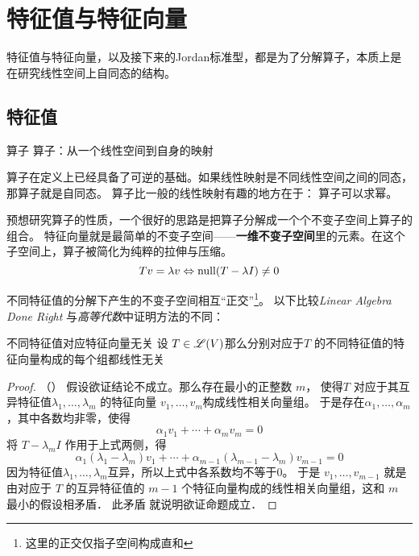 \chapter{特征值与特征向量}
特征值与特征向量，以及接下来的Jordan标准型，都是为了分解算子，本质上是在研究线性空间上自同态的结构。

\section{特征值}
\begin{definition}{算子}
    算子：从一个线性空间到自身的映射
\end{definition}

算子在定义上已经具备了可逆的基础。如果线性映射是不同线性空间之间的同态，那算子就是自同态。
算子比一般的线性映射有趣的地方在于： 算子可以求幂。

预想研究算子的性质，一个很好的思路是把算子分解成一个个不变子空间上算子的组合。
特征向量就是最简单的不变子空间——\textbf{一维不变子空间}里的元素。在这个子空间上，算子被简化为纯粹的拉伸与压缩。
\[
    Tv=\lambda v \Leftrightarrow \operatorname{null}(T-\lambda I)\neq {0}
\]

不同特征值的分解下产生的不变子空间相互``正交''\footnote{这里的正交仅指子空间构成直和}。
以下比较\textit{Linear Algebra Done Right} 与\textit{高等代数}中证明方法的不同：

\begin{theorem}{不同特征值对应特征向量无关}
    设 \(T \in \mathscr{L}(V)\)那么分别对应于\(T\) 的不同特征值的特征向量构成的每个组都线性无关
\end{theorem}

\begin{proof}
    （\cite[p.~114]{LinearAlgebraDone2024}）
    假设欲证结论不成立。那么存在最小的正整数 \(m\)， 使得\(T\)
    对应于其互异特征值\(\lambda_1, \dots ,\lambda_{m}\)
    的特征向量 \(v_1, \dots, v_m\)构成线性相关向量组。
    于是存在\(\alpha_1, \dots ,\alpha_{m}\)，其中各数均非零，使得
    \[\alpha_1 v_1 + \cdots + \alpha_m v_m = 0\]
    将 \(T-\lambda_{m}I\) 作用于上式两侧，得
    \[
        \alpha_1 (\lambda_1 - \lambda_m)v_1 + \cdots +
        \alpha_{m-1} (\lambda_{m-1} - \lambda_m)v_{m-1} = 0
    \]
    因为特征值\(\lambda_1,\dots ,\lambda_{m}\)互异，所以上式中各系数均不等于0。
    于是 \(v_1, \dots , v_{m-1}\) 就是由对应于 \(T\)
    的互异特征值的 \(m- 1\) 个特征向量构成的线性相关向量组，这和 \(m\) 最小的假设相矛盾． 此矛盾
    就说明欲证命题成立．
\end{proof}

